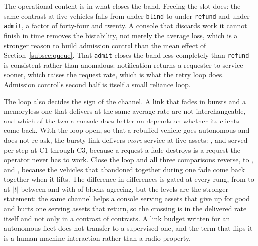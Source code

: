 \documentclass[11pt]{article}
\begin{document}
The operational content is in what closes the band. Freeing the slot does: the same contrast at five vehicles falls from \qBandBlind{} under \texttt{blind} to \qBandRefund{} under \texttt{refund} and \qBandAdmit{} under \texttt{admit}, a factor of forty-four and twenty. A console that discards work it cannot finish in time removes the bistability, not merely the average loss, which is a stronger reason to build admission control than the mean effect of Section~\ref{subsec:queue}. That \texttt{admit} closes the band less completely than \texttt{refund} is consistent rather than anomalous: notification returns a requester to service sooner, which raises the request rate, which is what the retry loop does. Admission control's second half is itself a small reliance loop.

The loop also decides the sign of the channel. A link that fades in bursts and a memoryless one that delivers at the same average rate are not interchangeable, and which of the two a console does better on depends on whether its clients come back. With the loop open, so that a rebuffed vehicle goes autonomous and does not re-ask, the bursty link delivers \emph{more} service at five assets: \grFlipROneOpen{}, \grFlipRTwoOpen{} and \grFlipRThreeOpen{} served per step at C1 through C3, because a request a fade destroys is a request the operator never has to work. Close the loop and all three comparisons reverse, to \grFlipROneClosed{}, \grFlipRTwoClosed{} and \grFlipRThreeClosed{}, because the vehicles that abandoned together during one fade come back together when it lifts. The difference in differences is gated at every rung, from \grFlipROneDid{} to \grFlipRTwoDid{} at $|t|$ between \grFlipMinT{} and \grFlipMaxT{} with \grFlipMinBlocks{} of \grFlipBlocks{} blocks agreeing, but the levels are the stronger statement: the same channel helps a console serving assets that give up for good and hurts one serving assets that return, so the crossing is in the delivered rate itself and not only in a contrast of contrasts. A link budget written for an autonomous fleet does not transfer to a supervised one, and the term that flips it is a human-machine interaction rather than a radio property.
\end{document}
